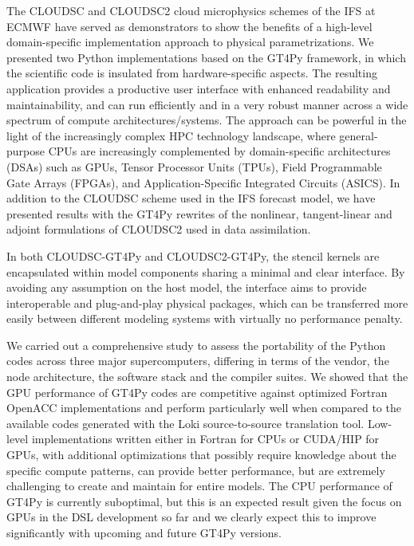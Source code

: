 \documentclass[gmd,manuscript,online]{copernicus}
\theoremstyle{theorem}
\theoremstyle{definition}
\theoremstyle{remark}
\theoremstyle{proposition}
\begin{document}
	The CLOUDSC and CLOUDSC2 cloud microphysics schemes of the IFS at ECMWF have served as demonstrators to show the benefits of a high-level domain-specific implementation approach to physical parametrizations. We presented two Python implementations based on the GT4Py framework, in which the scientific code is insulated from hardware-specific aspects. The resulting application provides a productive user interface with enhanced readability and maintainability, and can run efficiently and in a very robust manner across a wide spectrum of compute architectures/systems. The approach can be powerful in the light of the increasingly complex HPC technology landscape, where general-purpose CPUs are increasingly complemented by domain-specific architectures (DSAs) such as GPUs, Tensor Processor Units (TPUs), Field Programmable Gate Arrays (FPGAs), and Application-Specific Integrated Circuits (ASICS). In addition to the CLOUDSC scheme used in the IFS forecast model, we have presented results with the GT4Py rewrites of the nonlinear, tangent-linear and adjoint formulations of CLOUDSC2 used in data assimilation.

	In both CLOUDSC-GT4Py and CLOUDSC2-GT4Py, the stencil kernels are encapsulated within model components sharing a minimal and clear interface. By avoiding any assumption on the host model, the interface aims to provide interoperable and plug-and-play physical packages, which can be transferred more easily between different modeling systems with virtually no performance penalty.

	We carried out a comprehensive study to assess the portability of the Python codes across three major supercomputers, differing in terms of the vendor, the node architecture, the software stack and the compiler suites. We showed that the GPU performance of GT4Py codes are competitive against optimized Fortran OpenACC implementations and perform particularly well when compared to the available codes generated with the Loki source-to-source translation tool. Low-level implementations written either in Fortran for CPUs or CUDA/HIP for GPUs, with additional optimizations that possibly require knowledge about the specific compute patterns, can provide better performance, but are extremely challenging to create and maintain for entire models. The CPU performance of GT4Py is currently suboptimal, but this is an expected result given the focus on GPUs in the DSL development so far and we clearly expect this to improve significantly with upcoming and future GT4Py versions.
\end{document}
